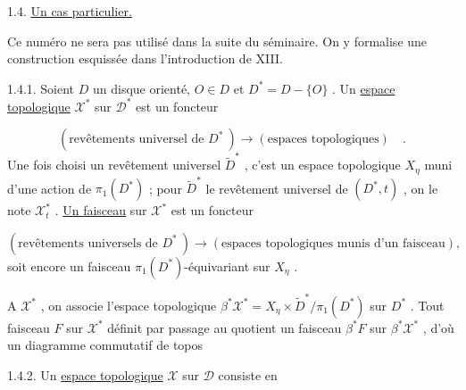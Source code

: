 1.4. \underline{Un cas particulier.}

Ce numéro ne sera pas utilisé dans la suite du séminaire. On y formalise une
construction esquissée dans l'introduction de XIII.

1.4.1. Soient $D$ un disque orienté, $O \in D$ et $D^* = D-\{O\}$ . Un \underline{espace topologique} $\mathcal{X}^*$ sur $\mathcal{D}^*$ est un foncteur

\begin{equation*}
(\mbox{revêtements universel de } D^*\ ) \longrightarrow (\mbox{espaces topologiques}) \quad .
\end{equation*}
Une fois choisi un revêtement universel $\widetilde{D}^*$ , c'est un espace topologique $X_\eta$ muni d'une action de $\pi_1(D^*)$ ; pour $\widetilde{D}^*$ le revêtement universel de $(D^*, t)$ , on le note $\mathcal{X}^*_t$ . \underline{Un faisceau} sur $\mathcal{X}^*$ est un foncteur

\begin{equation*}
(\mbox{revêtements universels de } D^*\ ) \longrightarrow (\mbox{espaces topologiques munis d'un faisceau}),
\end{equation*}
soit encore un faisceau $\pi_1(D^*)$-équivariant sur $X_\eta$ .

A $\mathcal{X}^*$ , on associe l'espace topologique $\beta^* \mathcal{X}^* = X_\eta \times \widetilde{D}^*/\pi_1(D^*)$ sur $D^*$ . Tout faisceau $F$ sur $\mathcal{X}^*$ définit par passage au quotient un faisceau $\beta^*F$ sur $\beta^* \mathcal{X}^*$ , d'où un diagramme commutatif de topos

\begin{center}
\end{center}
1.4.2. Un \underline{espace topologique} $\mathcal{X}$ sur $\mathcal{D}$ consiste en

